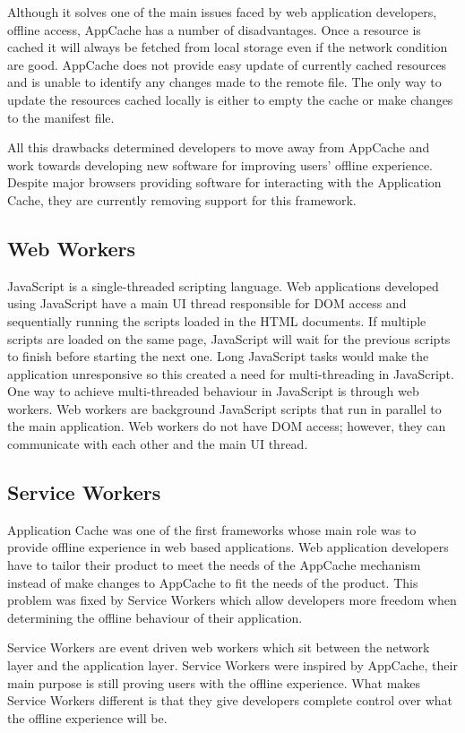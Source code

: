\documentclass[10pt,a4paper,twoside]{book}
\begin{document}
Although it solves one of the main issues faced by web application developers, offline access, AppCache has a number of disadvantages. Once a resource is cached it will always be fetched from local storage even if the network condition are good. AppCache does not provide easy update of currently cached resources and is unable to identify any changes made to the remote file. The only way to update the resources cached locally is either to empty the cache or make changes to the manifest file.

All this drawbacks determined developers to move away from AppCache and work towards developing new software for improving users' offline experience. Despite major browsers providing software for interacting with the Application Cache, they are currently removing support for this framework.

\subsection{Web Workers}
JavaScript is a single-threaded scripting language. Web applications developed using JavaScript have a main UI thread responsible for DOM access and sequentially running the scripts loaded in the HTML documents. If multiple scripts are loaded on the same page, JavaScript will wait for the previous scripts to finish before starting the next one. Long JavaScript tasks would make the application unresponsive so this created a need for multi-threading in JavaScript. One way to achieve multi-threaded behaviour in JavaScript is through web workers. Web workers are background JavaScript scripts that run in parallel to the main application. Web workers do not have DOM access; however, they can communicate with each other and the main UI thread.

\subsection{Service Workers}
Application Cache was one of the first frameworks whose main role was to provide offline experience in web based applications. Web application developers have to tailor their product to meet the needs of the AppCache mechanism instead of make changes to AppCache to fit the needs of the product. This problem was fixed by Service Workers which allow developers more freedom when determining the offline behaviour of their application.

Service Workers are event driven web workers which sit between the network layer and the application layer. Service Workers were inspired by AppCache, their main purpose is still proving users with the offline experience. What makes Service Workers different is that they give developers complete control over what the offline experience will be. 
\end{document}
